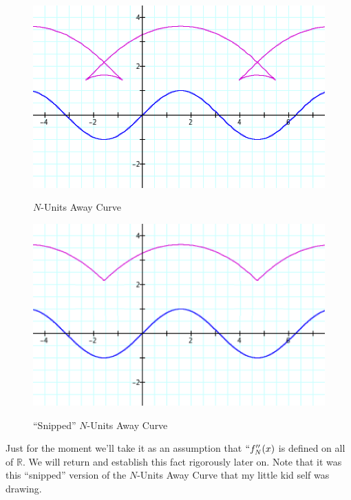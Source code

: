 \begin{figure}[H]
  \centering
  \begin{minipage}[b]{\w}
    \centering
    \label{formal:1}
    \includegraphics[width=\fw]{img/05-formal-definitions/01.png}
    \caption{$N$-Units Away Curve}
    \vspace{4ex}
  \end{minipage} %
  \begin{minipage}[b]{\w}
    \centering
    \label{formal:2}
    \includegraphics[width=\fw]{img/05-formal-definitions/02.png}
    \caption{``Snipped'' $N$-Units Away Curve}
    \vspace{4ex}
  \end{minipage} %
\end{figure}

Just for the moment we'll take it as an assumption that $``f_N''(x)$ is defined on all of $\mathbb{R}$. We will return and establish this fact rigorously later on. Note that it was this ``snipped'' version of the $N$-Units Away Curve that my little kid self was drawing.
